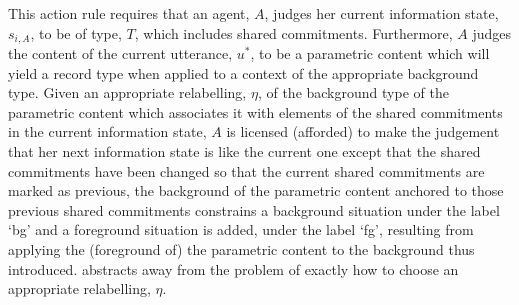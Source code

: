 This action rule requires that an agent, $A$, judges her current
information state, $s_{i,A}$, to be of type, $T$, which includes
shared commitments.  Furthermore, $A$ judges the content of the
current utterance, $u^*$, to be a parametric content which will yield
a record type when applied to a context of the appropriate background
type.  Given an appropriate relabelling, $\eta$, of the background type of the
parametric content which associates it with elements of the shared
commitments in the current information state, $A$ is licensed
(afforded) to make the judgement that her next information state is
like the current one except that the shared commitments have been
changed so that the current shared commitments are marked as previous,
the background of the parametric content anchored to those previous
shared commitments constrains a background situation under the label
`bg' and a foreground situation is added, under the label `fg', resulting from applying the
(foreground of) the parametric content to the background thus
introduced.  \preveg{} abstracts away from the problem of exactly how
to choose an appropriate relabelling, $\eta$.  %

  


